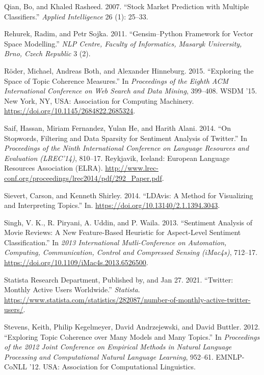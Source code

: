 \documentclass[
]{article}
\newlength{\cslhangindent}
\newlength{\cslentryspacingunit} %
\newenvironment{CSLReferences}[2] %
 {%
  \setlength{\parindent}{0pt}
  \ifodd #1
  \let\oldpar\par
  \def\par{\hangindent=\cslhangindent\oldpar}
  \fi
  \setlength{\parskip}{#2\cslentryspacingunit}
 }%
 {}
\begin{document}
\begin{CSLReferences}{1}{0}
\leavevmode{}%
Qian, Bo, and Khaled Rasheed. 2007. {``Stock Market Prediction with
Multiple Classifiers.''} \emph{Applied Intelligence} 26 (1): 25--33.

\leavevmode{}%
Rehurek, Radim, and Petr Sojka. 2011. {``Gensim--Python Framework for
Vector Space Modelling.''} \emph{NLP Centre, Faculty of Informatics,
Masaryk University, Brno, Czech Republic} 3 (2).

\leavevmode{}%
Röder, Michael, Andreas Both, and Alexander Hinneburg. 2015.
{``Exploring the Space of Topic Coherence Measures.''} In
\emph{Proceedings of the Eighth ACM International Conference on Web
Search and Data Mining}, 399--408. WSDM '15. New York, NY, USA:
Association for Computing Machinery.
\url{https://doi.org/10.1145/2684822.2685324}.

\leavevmode{}%
Saif, Hassan, Miriam Fernandez, Yulan He, and Harith Alani. 2014. {``On
Stopwords, Filtering and Data Sparsity for Sentiment Analysis of
{T}witter.''} In \emph{Proceedings of the Ninth International Conference
on Language Resources and Evaluation ({LREC}'14)}, 810--17. Reykjavik,
Iceland: European Language Resources Association (ELRA).
\url{http://www.lrec-conf.org/proceedings/lrec2014/pdf/292_Paper.pdf}.

\leavevmode{}%
Sievert, Carson, and Kenneth Shirley. 2014. {``LDAvis: A Method for
Visualizing and Interpreting Topics.''} In.
\url{https://doi.org/10.13140/2.1.1394.3043}.

\leavevmode{}%
Singh, V. K., R. Piryani, A. Uddin, and P. Waila. 2013. {``Sentiment
Analysis of Movie Reviews: A New Feature-Based Heuristic for
Aspect-Level Sentiment Classification.''} In \emph{2013 International
Mutli-Conference on Automation, Computing, Communication, Control and
Compressed Sensing (iMac4s)}, 712--17.
\url{https://doi.org/10.1109/iMac4s.2013.6526500}.

\leavevmode{}%
Statista Research Department, Published by, and Jan 27. 2021.
{``Twitter: Monthly Active Users Worldwide.''} \emph{Statista}.
\url{https://www.statista.com/statistics/282087/number-of-monthly-active-twitter-users/}.

\leavevmode{}%
Stevens, Keith, Philip Kegelmeyer, David Andrzejewski, and David
Buttler. 2012. {``Exploring Topic Coherence over Many Models and Many
Topics.''} In \emph{Proceedings of the 2012 Joint Conference on
Empirical Methods in Natural Language Processing and Computational
Natural Language Learning}, 952--61. EMNLP-CoNLL '12. USA: Association
for Computational Linguistics.


\end{CSLReferences}
\end{document}
